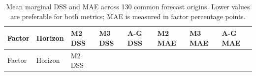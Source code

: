 \documentclass[
  12pt,
  letterpaper,
  DIV=11,
  numbers=noendperiod]{scrreprt}
\begin{document}
\begin{longtable}[]{@{}
  >{\raggedright\arraybackslash}p{}
  >{\raggedleft\arraybackslash}p{}
  >{\raggedleft\arraybackslash}p{}
  >{\raggedleft\arraybackslash}p{}
  >{\raggedleft\arraybackslash}p{}
  >{\raggedleft\arraybackslash}p{}
  >{\raggedleft\arraybackslash}p{}
  >{\raggedleft\arraybackslash}p{}@{}}
\caption{Mean marginal DSS and MAE across 130 common forecast origins.
Lower values are preferable for both metrics; MAE is measured in factor
percentage points.}\label{tbl-factor-dss-mae}\tabularnewline
\toprule\noalign{}
\begin{minipage}[b]{\linewidth}\raggedright
Factor
\end{minipage} & \begin{minipage}[b]{\linewidth}\raggedleft
Horizon
\end{minipage} & \begin{minipage}[b]{\linewidth}\raggedleft
M2 DSS
\end{minipage} & \begin{minipage}[b]{\linewidth}\raggedleft
M3 DSS
\end{minipage} & \begin{minipage}[b]{\linewidth}\raggedleft
A-G DSS
\end{minipage} & \begin{minipage}[b]{\linewidth}\raggedleft
M2 MAE
\end{minipage} & \begin{minipage}[b]{\linewidth}\raggedleft
M3 MAE
\end{minipage} & \begin{minipage}[b]{\linewidth}\raggedleft
A-G MAE
\end{minipage} \\
\midrule\noalign{}
\endfirsthead
\toprule\noalign{}
\begin{minipage}[b]{\linewidth}\raggedright
Factor
\end{minipage} & \begin{minipage}[b]{\linewidth}\raggedleft
Horizon
\end{minipage} & \begin{minipage}[b]{\linewidth}\raggedleft
M2 DSS
\end{minipage} & \begin{minipage}[b]{\linewidth}\raggedleft

\end{minipage}
\end{longtable}
\end{document}
